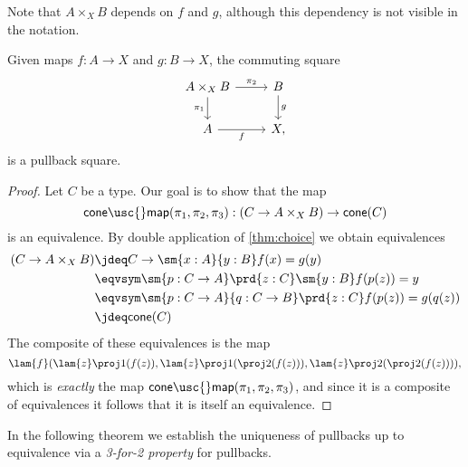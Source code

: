 Note that $A\times_X B$ depends on $f$ and $g$, although this dependency is not visible in the notation.

\begin{thm}
Given maps $f:A\to X$ and $g:B\to X$, the commuting square
\begin{equation*}
\begin{tikzcd}
A\times_X B \arrow[r,"\pi_2"] \arrow[d,swap,"\pi_1"] & B \arrow[d,"g"] \\
A \arrow[r,swap,"f"] & X,
\end{tikzcd}
\end{equation*}
is a pullback square.
\end{thm}

\begin{proof}
Let $C$ be a type. Our goal is to show that the map
\begin{equation*}
\mathsf{cone\usc{}map}(\pi_1,\pi_2,\pi_3): (C\to A\times_X B)\to \mathsf{cone}(C)
\end{equation*}
is an equivalence. 
By double application of \cref{thm:choice} we obtain equivalences
\begin{align*}
(C\to A\times_X B) & \jdeq C\to \sm{x:A}{y:B}f(x)=g(y) \\
& \eqvsym \sm{p:C\to A}\prd{z:C}\sm{y:B} f(p(z))= y \\
& \eqvsym \sm{p:C\to A}{q:C\to B}\prd{z:C} f(p(z))= g(q(z)) \\
& \jdeq \mathsf{cone}(C)
\end{align*}
The composite of these equivalences is the map
\begin{equation*}
\lam{f}(\lam{z}\proj 1(f(z)),\lam{z} \proj 1(\proj 2(f(z))),\lam{z}\proj 2(\proj 2(f(z)))),
\end{equation*}
which is \emph{exactly} the map $\mathsf{cone\usc{}map}(\pi_1,\pi_2,\pi_3)$, and since it is a composite of equivalences it follows that it is itself an equivalence.
\end{proof}

In the following theorem we establish the uniqueness of pullbacks up to equivalence via a \emph{3-for-2 property} for pullbacks.


